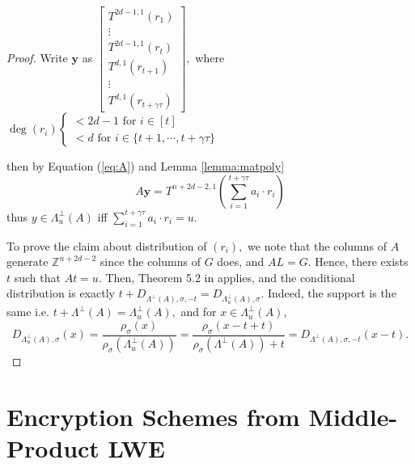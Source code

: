 \documentclass[11pt]{article}
\newcommand{\Z}{\mathbb{Z}}
\begin{document}
\begin{proof}
     
     Write $\textbf{y}$ as $\begin{bmatrix} T^{2d-1,1}(r_1) \\ \vdots \\ T^{2d-1,1}(r_t) \\ T^{d,1}(r_{t+1}) \\ \vdots \\ T^{d,1}(r_{t+\gamma \tau})   \end{bmatrix},$ where $\deg(r_i) \begin{cases} <2d-1 \text{ for $i\in [t]$} \\  < d \text{ for $i\in \{t+1, \cdots, t+\gamma\tau\}$} \end{cases}$
     
     then by Equation (\ref{eq:A}) and Lemma \ref{lemma:matpoly}
     \begin{equation} A \textbf{y} = T^{n+2d-2, 1} ( \sum_{i=1}^{t+ \gamma \tau} a_i \cdot r_i)  \end{equation}
     thus $y \in \Lambda^{\perp}_u(A)$ iff $\sum_{i=1}^{t+\gamma \tau} a_i \cdot r_i = u.$
     
     To prove the claim about distribution of $(r_i),$ we note that the columns of $A$ generate $\Z^{n+2d-2}$ since the columns of $G$ does, and $A L = G.$ Hence, there exists $t$ such that $At = u.$ Then, Theorem 5.2 in \cite{trapdoor} applies, and the conditional distribution is exactly $t + D_{\Lambda^{\perp}(A), \sigma, -t} = D_{\Lambda^{\perp}_u(A), \sigma}.$ Indeed, the support is the same i.e. $t + \Lambda^{\perp}(A) = \Lambda^{\perp}_u(A),$ and for $x \in \Lambda^{\perp}_u(A),$
     $$D_{\Lambda^{\perp}_u(A), \sigma} (x) = \frac{\rho_{\sigma} (x) }{ \rho_{\sigma} (\Lambda^{\perp}_u(A))} = \frac{\rho_{\sigma} (x-t+t) }{ \rho_{\sigma} (\Lambda^{\perp}(A)) +t} = D_{\Lambda^{\perp}(A), \sigma, -t} (x-t).$$
     
     \end{proof}
     
\section{Encryption Schemes from Middle-Product LWE}
\end{document}
